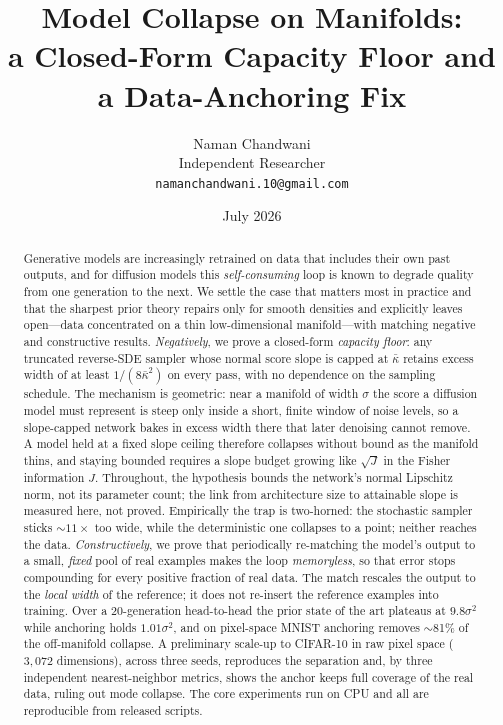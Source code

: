 \documentclass[11pt]{article}
\title{\bf Model Collapse on Manifolds:\\ a Closed-Form Capacity Floor and a Data-Anchoring Fix}
\author{Naman Chandwani\\ \small Independent Researcher\\ \small \texttt{namanchandwani.10@gmail.com}}
\date{July 2026}
\theoremstyle{remark}
\newcommand{\kb}{\bar\kappa}
\begin{document}
\maketitle

\begin{abstract}
Generative models are increasingly retrained on data that includes their own past outputs,
and for diffusion models this \emph{self-consuming} loop is known to degrade quality from
one generation to the next. We settle the case that matters most in practice and that the
sharpest prior theory \citep{khelifa2026recursive} repairs only for smooth densities and
explicitly leaves open---data concentrated on a thin low-dimensional manifold---with
matching negative and constructive results. \emph{Negatively}, we prove a closed-form
\emph{capacity floor}: any truncated reverse-SDE sampler whose normal score slope is capped
at $\kb$ retains excess width of at least $1/(8\kb^2)$ on every pass, with no dependence on
the sampling schedule. The mechanism is geometric: near a manifold of width $\sigma$ the
score a diffusion model must represent is steep only inside a short, finite window of noise
levels, so a slope-capped network bakes in excess width there that later denoising cannot
remove. A model held at a fixed slope ceiling therefore collapses without bound as the manifold
thins, and staying bounded requires a slope budget growing like $\sqrt{J}$ in the Fisher
information $J$. Throughout, the hypothesis bounds the network's normal Lipschitz norm, not
its parameter count; the link from architecture size to attainable slope is measured here,
not proved. Empirically
the trap is two-horned: the
stochastic sampler sticks $\sim\!11\times$ too wide, while the deterministic one collapses to
a point; neither reaches the data. \emph{Constructively}, we prove that periodically
re-matching the model's output to a small, \emph{fixed} pool of real examples makes the loop
\emph{memoryless}, so that error stops compounding for every positive fraction of real data.
The match rescales the output to the \emph{local width} of the reference; it does not
re-insert the reference examples into training. Over a 20-generation head-to-head the
prior state of the art plateaus at $9.8\sigma^2$ while anchoring holds $1.01\sigma^2$, and
on pixel-space MNIST anchoring removes $\sim$81\% of the off-manifold collapse. A
preliminary scale-up to CIFAR-10 in raw pixel space ($3{,}072$ dimensions), across three
seeds, reproduces the separation and, by three independent nearest-neighbor metrics, shows
the anchor keeps full coverage of the real data, ruling out mode collapse. The core
experiments run on CPU and all are reproducible from released scripts.
\end{abstract}
\end{document}
